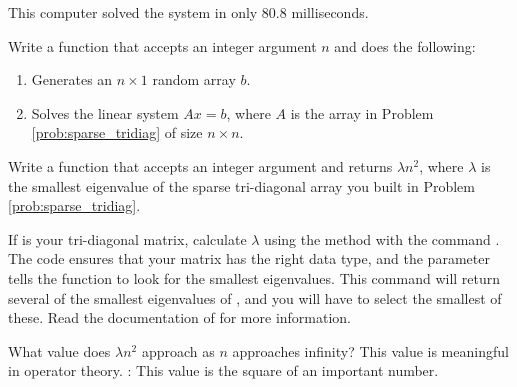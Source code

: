 This computer solved the system in only 80.8 milliseconds.

\begin{problem}
Write a function that accepts an integer argument $n$ and does the following:
\begin{enumerate}
\item Generates an $n \times 1$ random array $b$.
\item Solves the linear system $Ax = b$, where $A$ is the array in Problem \ref{prob:sparse_tridiag} of size $n \times n$.
\end{enumerate}
\end{problem}



\begin{problem}
Write a function that accepts an integer argument  and returns $\lambda n^2$, where
$\lambda$ is the smallest eigenvalue of the sparse tri-diagonal array you built in Problem \ref{prob:sparse_tridiag}.

If  is your tri-diagonal matrix, calculate $\lambda$ using the method  with the command . 
The code  ensures that your matrix has the right data type, and the parameter  tells the function to look for the smallest eigenvalues. 
This command will return several of the smallest eigenvalues of , and you will have to select the smallest of these. 
Read the documentation of  for more information.

What value does $\lambda n^2$ approach as $n$ approaches infinity? 
This value is meaningful in operator theory. 
: This value is the square of an important number.

\end{problem}





 

